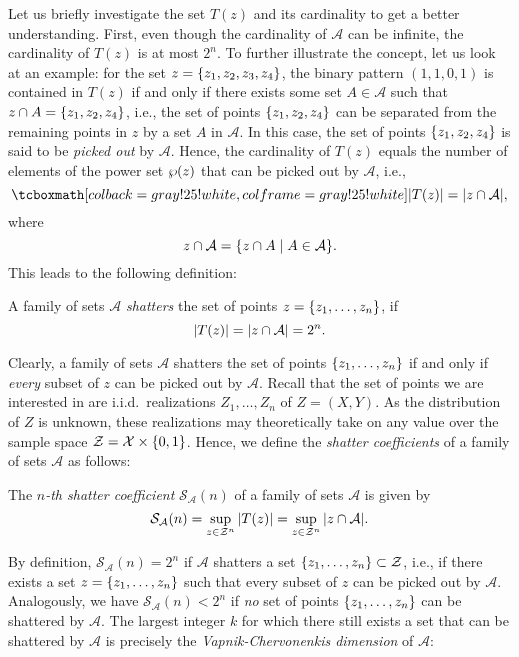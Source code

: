 Let us briefly investigate the set $T(z)$ and its cardinality to get a better understanding. First, even though the cardinality of $\mathcal{A}$ can be infinite, the cardinality of $T(z)$ is at most $2^n$. To further illustrate the concept, let us look at an example: for the set $z = \set{z_1, z_2, z_3, z_4}$, the binary pattern $(1, 1, 0, 1)$ is contained in $T(z)$ if and only if there exists some set $A \in \mathcal{A}$ such that $z \cap A = \set{z_1, z_2, z_4}$, i.e., the set of points $\set {z_1, z_2, z_4}$ can be separated from the remaining points in $z$ by a set $A$ in $\mathcal{A}$. In this case, the set of points $\set{z_1, z_2, z_4}$ is said to be \emph{picked out} by $\mathcal{A}$. Hence, the cardinality of $T(z)$ equals the number of elements of the power set $\operatorname{\wp}(z)$ that can be picked out by $\mathcal{A}$, i.e.,
\[
    \highlightMath{
        \abs{T(z)} = \abs{z \cap \mathcal{A}},
    }
\]
where
\[
    z \cap \mathcal{A} = \set{z \cap A \with A \in \mathcal{A}}.
\]
This leads to the following definition:

\begin{definition}
A family of sets $\mathcal{A}$ \emph{shatters} the set of points $z = \set{z_1, \dots, z_n}$, if
\[
    \abs{T(z)} = \abs{z \cap \mathcal{A}} = 2^n.
\]
\end{definition}

Clearly, a family of sets $\mathcal{A}$ shatters the set of points $\set{z_1, \dots, z_n}$ if and only if \emph{every} subset of $z$ can be picked out by $\mathcal{A}$. Recall that the set of points we are interested in are i.i.d.\ realizations $Z_1, \dots, Z_n$ of $Z = (X, Y)$. As the distribution of $Z$ is unknown, these realizations may theoretically take on any value over the sample space $\mathcal{Z} = \mathcal{X} \times \set{0, 1}$. Hence, we define the \emph{shatter coefficients} of a family of sets $\mathcal{A}$ as follows:

\begin{definition}
The \emph{$n$-th shatter coefficient} $\mathcal{S}_{\mathcal{A}}(n)$ of a family of sets $\mathcal{A}$ is given by
\[
    \mathcal{S}_{\mathcal{A}}(n) = \sup_{z \in \mathcal{Z}^n} \abs{T(z)} = \sup_{z \in \mathcal{Z}^n} \abs{z \cap \mathcal{A}}.
\]
\end{definition}

By definition, $\mathcal{S}_{\mathcal{A}}(n) = 2^n$ if $\mathcal{A}$ shatters a set $\set{z_1, \dots, z_n} \subset \mathcal{Z}$, i.e., if there exists a set $z = \set{z_1, \dots, z_n}$ such that every subset of $z$ can be picked out by $\mathcal{A}$. Analogously, we have $\mathcal{S}_{\mathcal{A}}(n) < 2^n$ if \emph{no} set of points $\set{z_1, \dots, z_n}$ can be shattered by $\mathcal{A}$. The largest integer $k$ for which there still exists a set that can be shattered by $\mathcal{A}$ is precisely the \emph{Vapnik-Chervonenkis dimension} of $\mathcal{A}$:

